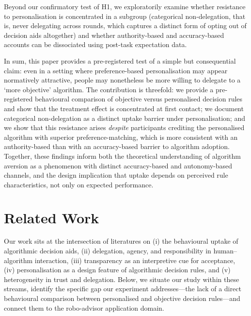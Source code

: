 \documentclass[a4paper, 12pt, fleqn]{article}
\theoremstyle{hypstyle}
\begin{document}
Beyond our confirmatory test of H1, we exploratorily examine whether resistance to personalisation is concentrated in a subgroup (categorical non-delegation, that is, never delegating across rounds, which captures a distinct form of opting out of decision aids altogether) and whether authority-based and accuracy-based accounts can be dissociated using post-task expectation data.

In sum, this paper provides a pre-registered test of a simple but consequential claim: even in a setting where preference-based personalisation may appear normatively attractive, people may nonetheless be more willing to delegate to a `more objective' algorithm. The contribution is threefold: we provide a pre-registered behavioural comparison of objective versus personalised decision rules and show that the treatment effect is concentrated at first contact; we document categorical non-delegation as a distinct uptake barrier under personalisation; and we show that this resistance arises \emph{despite} participants crediting the personalised algorithm with superior preference-matching, which is more consistent with an authority-based than with an accuracy-based barrier to algorithm adoption. Together, these findings inform both the theoretical understanding of algorithm aversion as a phenomenon with distinct accuracy-based and autonomy-based channels, and the design implication that uptake depends on perceived rule characteristics, not only on expected performance.

\section{Related Work}
\label{sec:related}

Our work sits at the intersection of literatures on (i) the behavioural uptake of algorithmic decision aids, (ii) delegation, agency, and responsibility in human--algorithm interaction, (iii) transparency as an interpretive cue for acceptance, (iv) personalisation as a design feature of algorithmic decision rules, and (v) heterogeneity in trust and delegation. Below, we situate our study within these streams, identify the specific gap our experiment addresses---the lack of a direct behavioural comparison between personalised and objective decision rules---and connect them to the robo-advisor application domain.
\end{document}
